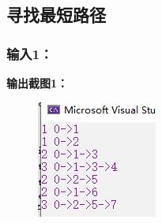 \documentclass[UTF8]{article}
\begin{document}
	\subsection{寻找最短路径}
	\subsubsection{输入1：}\par
	\par
	\textbf{输出截图1：}\par
	\begin{figure}[H]
		\centering
		\includegraphics[scale=1]{output21.jpg}
		\label{output21}
	\end{figure}\par
\end{document}
